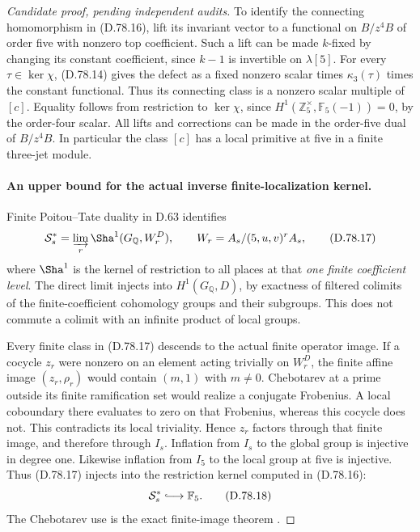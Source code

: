 \begin{proof}[Candidate proof, pending independent audits]
To identify the connecting homomorphism in (D.78.16),
lift its invariant vector to a functional on \(B/z^4B\)
of order five with nonzero top coefficient. Such a lift
can be made \(k\)-fixed by changing its constant coefficient,
since \(k-1\) is invertible on \(\lambda[5]\).
For every \(\tau\in\ker\chi\), (D.78.14) gives the defect
as a fixed nonzero scalar times
\(\kappa_3(\tau)\) times the constant functional.
Thus its connecting class is a nonzero scalar multiple
of \([c]\). Equality follows from restriction to
\(\ker\chi\), since
\(H^1(\mathbb Z_5^\times,\mathbb F_5(-1))=0\), by the
order-four scalar. All lifts and corrections can be
made in the order-five dual of \(B/z^4B\).
In particular the class \([c]\) has a local primitive at
five in a finite three-jet module.

\paragraph{An upper bound for the actual inverse finite-localization kernel.}
Finite Poitou--Tate duality in D.63 identifies
\[
 \mathcal S_s^*=\varinjlim_r
       \Sha^1(G_{\mathbb Q},W_r^D),
       \qquad W_r=A_s/(5,u,v)^rA_s,                     \tag{D.78.17}
\]
where \(\Sha^1\) is the kernel of restriction to all places
at that \emph{one finite coefficient level}. The direct
limit injects into \(H^1(G_{\mathbb Q},D)\), by exactness
of filtered colimits of the finite-coefficient cohomology
groups and their subgroups. This does not commute a
colimit with an infinite product of local groups.

Every finite class in (D.78.17) descends to the actual
finite operator image. If a cocycle \(z_r\) were nonzero
on an element acting trivially on \(W_r^D\), the finite
affine image \((z_r,\rho_r)\) would contain
\((m,1)\) with \(m\ne0\). Chebotarev at a prime outside
its finite ramification set would realize a conjugate
Frobenius. A local coboundary there evaluates to zero on
that Frobenius, whereas this cocycle does not. This
contradicts its local triviality. Hence \(z_r\) factors
through that finite image, and therefore through \(I_s\).
Inflation from \(I_s\) to the global group is injective
in degree one. Likewise inflation from \(I_5\) to the
local group at five is injective. Thus (D.78.17) injects
into the restriction kernel computed in (D.78.16):
\[
                         \mathcal S_s^*
                                  \lhook\joinrel\longrightarrow\mathbb F_5.
                                                               \tag{D.78.18}
\]
The Chebotarev use is the exact finite-image theorem
\cite[V, Theorem 3.23]{PBC_MilneCFT}.


\end{proof}
